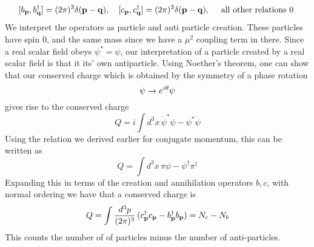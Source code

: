 \[ 	
[  b _\mathbf{ p}, b _\mathbf{ q}^\dagger]  = ( 2\pi) ^3 \delta ( \mathbf{  p -q  } ), \quad [  c _\mathbf{ p}, c _\mathbf{ q}^\dagger]  = ( 2\pi) ^3 \delta ( \mathbf{  p -q  } ), \quad \text{ all other relations 0 } 
\] We interpret the operators as particle and anti particle creation. These particles have spin 0, and the same mass since we have a $\mu^2 $ coupling term in there. Since a real scalar field obeys $\psi^* = \psi $, our interpretation of a particle created by a real scalar field is that it its' own antiparticle. Using Noether's theorem, one can show that our conserved charge which is obtained by the symmetry of a phase rotation 
\[	
\psi \rightarrow e^{ i \theta} \psi 
\] gives rise to the conserved charge 
\[
Q  = i \int d^3 x \,  \dot{ \psi}^* \psi - \psi^* \dot{ \psi }  
\] Using the relation we derived earlier for conjugate momentum, this can be written as 
\[ 
Q = \int d^3 x\, \pi \psi - \psi^\dagger \pi^\dagger 
\] Expanding this in terms of the creation and annihilation operators $b,c$, with normal ordering we have that a conserved charge is 
\[ 	 
Q  = \int \frac{ d^3 p }{ (2 \pi)^3 } \, ( c_\mathbf{ p}^\dagger c_\mathbf{ p } - b _\mathbf{ p }^\dagger  b _\mathbf{ p } ) = N_c - N_b 
\] This counts the number of of particles minus the number of anti-particles. 

\pagebreak

